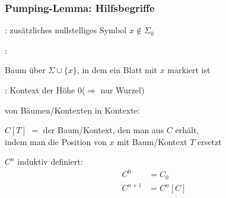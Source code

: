    \begin{frame}
      \frametitle{Pumping-Lemma: Hilfsbegriffe}
      
        
      \par\medskip
      \begin{Itemize}
        \item
          : zusätzliches nullstelliges Symbol $x \notin \Sigma_0$
          \par\smallskip
        \item
          :
          \par
          Baum über $\Sigma \cup \{x\}$, in dem ein Blatt mit $x$ markiert ist \Tafel
          \par\smallskip
        \item
          : Kontext der Höhe $0$\quad ($\Rightarrow$ nur Wurzel)
          \par\smallskip
        \item<2->
           von Bäumen/Kontexten in Kontexte:
          \begin{Itemize}
            \item
              $C[T]$ $=$ der Baum/Kontext, den man aus $C$ erhält,\\
              indem man die Position von $x$ mit Baum/Kontext $T$ ersetzt \TafelForts
            \item
              $C^n$ induktiv definiert:
              \begin{align*}
                C^0     & = C_0 \\
                C^{n+1} & = C^n[C]
              \end{align*}
          \end{Itemize}
      \end{Itemize}


    \end{frame}

